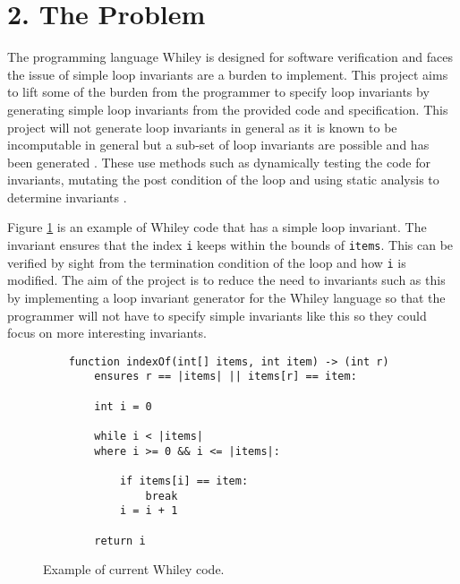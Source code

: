\documentclass[11pt, a4paper, twoside, openright]{report}
\newcommand{\code}[1]{\texttt{#1}}
\begin{document}

\section*{2. The Problem}




The programming language Whiley is designed for software verification \cite{whiley-design} and
faces the issue of simple loop invariants are a burden to implement.
This project aims to lift some of the burden from the programmer to specify loop invariants
by generating simple loop invariants from the provided code and specification.
This project will not generate loop invariants in general as it is known to be incomputable
in general but a sub-set of loop invariants are possible and has been generated \cite{infer-dynamic} \cite{infer-postconditions}.
These use methods such as dynamically testing the code for invariants, mutating the post condition of the loop
and using static analysis to determine invariants \cite{infer-dynamic} \cite{infer-postconditions}.

Figure \ref{fig:whiley-ex-1} is an example of Whiley code that has a simple loop invariant.
The invariant ensures that the index \code{i} keeps within the bounds of \code{items}.
This can be verified by sight from the termination condition of the loop and how \code{i} is modified.
The aim of the project is to reduce the need to invariants such as this by implementing
a loop invariant generator for the Whiley language so that the programmer will not have
to specify simple invariants like this so they could focus on more interesting invariants.

\begin{figure}[h]
    \begin{lstlisting}
    function indexOf(int[] items, int item) -> (int r)
        ensures r == |items| || items[r] == item:

        int i = 0

        while i < |items|
        where i >= 0 && i <= |items|:

            if items[i] == item:
                break
            i = i + 1

        return i
    \end{lstlisting}
    \caption{Example of current Whiley code.}
    \label{fig:whiley-ex-1}
\end{figure}
\end{document}
